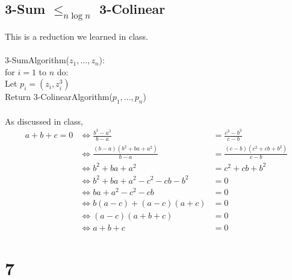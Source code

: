 \documentclass[letterpaper,notitlepage,twoside]{article}
\renewcommand{\iff}{\Leftrightarrow} %
\newcommand\tab[1][1cm]{\hspace*{#1}} %
\begin{document}
\subsection*{3-Sum $\leq_{n \log n}$ 3-Colinear}
This is a reduction we learned in class.
\\\\
3-SumAlgorithm($z_1,...,z_n$):\\
\tab for $i = 1$ to $n$ do:\\
\tab\tab Let $p_i = (z_i, z_i^3)$\\
\tab Return 3-ColinearAlgorithm($p_1,...,p_n$)
\\\\
As discussed in class,
\begin{align*}
a + b + c = 0 &\iff \frac{b^3 - a^3}{b - a} &= \frac{c^3 - b^3}{c - b}\\
&\iff \frac{(b - a)(b^2 + ba + a^2)}{b - a} &= \frac{(c - b)(c^2 + cb + b^2)}{c - b}\\
&\iff b^2 + ba + a^2 &= c^2 + cb + b^2\\
&\iff b^2 + ba + a^2 - c^2 - cb - b^2 &= 0\\
&\iff ba + a^2 - c^2 - cb &= 0\\
&\iff b(a - c) + (a - c)(a + c) &= 0\\
&\iff (a - c)(a + b + c) &= 0\\
&\iff a + b + c &= 0
\end{align*}

\section*{7}
\end{document}
